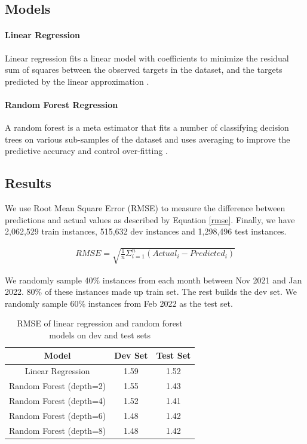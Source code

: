 \documentclass[11pt]{article}
\begin{document}
\subsection{Models}
\paragraph{Linear Regression}
Linear regression fits a linear model with coefficients to minimize the residual sum of squares between the observed targets in the dataset, and the targets predicted by the linear approximation \cite{scikit-learn}.

\paragraph{Random Forest Regression}
A random forest is a meta estimator that fits a number of classifying decision trees on various sub-samples of the dataset and uses averaging to improve the predictive accuracy and control over-fitting
\cite{scikit-learn}. 


\subsection{Results}
We use Root Mean Square Error (RMSE) to measure the difference between predictions and actual values as described by Equation \ref{rmse}. Finally, we have 2,062,529 train instances, 515,632 dev instances and 1,298,496 test instances.

\begin{align}
    RMSE = \sqrt{\frac{1}{n}\Sigma_{i=1}^{n}(Actual_i -Predicted_i)}
\label{rmse}
\end{align}

We randomly sample 40\% instances from each month between Nov 2021 and Jan 2022. 80\% of these instances made up train set. The rest builds the dev set. We randomly sample 60\% instances from Feb 2022 as the test set.
\begin{table}[]
    \centering
    \begin{tabular}{c|c|c}
    \hline
         Model& Dev Set & Test Set \\
    \hline
         Linear Regression& 1.59&1.52\\
         Random Forest (depth=2) & 1.55&1.43\\
         Random Forest (depth=4) & 1.52&1.41\\
         Random Forest (depth=6) & 1.48&1.42\\
         Random Forest (depth=8) & 1.48&1.42\\
    \hline
    \end{tabular}
    \caption{RMSE of linear regression and random forest models on dev and test sets}
    \label{tab:result}
\end{table}
\end{document}
